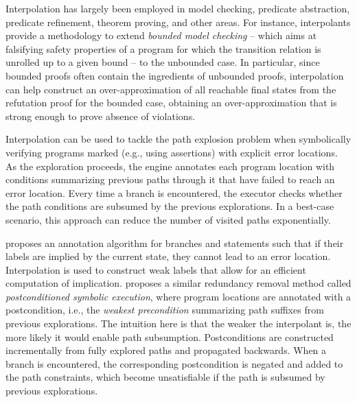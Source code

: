 Interpolation has largely been employed in model checking, predicate abstraction, predicate refinement, theorem proving, and other areas. For instance, interpolants provide a methodology to extend {\em bounded model checking} -- which aims at falsifying safety properties of a program for which the transition relation is unrolled up to a given bound -- to the unbounded case. In particular, since bounded proofs often contain the ingredients of unbounded proofs, interpolation can help construct an over-approximation of all reachable final states from the refutation proof for the bounded case, obtaining an over-approximation that is strong enough to prove absence of violations.

 Interpolation can be used to tackle the path explosion problem when symbolically verifying programs marked (e.g., using assertions) with explicit error locations. As the exploration proceeds, the engine annotates each program location with conditions summarizing previous paths through it that have failed to reach an error location. Every time a branch is encountered, the executor checks whether the path conditions are subsumed by the previous explorations. In a best-case scenario, this approach can reduce the number of visited paths exponentially. %

\cite{McMillan10} proposes an annotation algorithm for branches and statements such that if their labels are implied by the current state, they cannot lead to an error location. Interpolation is used to construct weak labels that allow for an efficient computation of implication. \cite{YYG15} proposes a similar redundancy removal method called {\em postconditioned symbolic execution}, where  program locations are annotated with a postcondition, i.e., the {\em weakest precondition} summarizing path suffixes from previous explorations. The intuition here is that the weaker the interpolant is, the more likely it would enable path subsumption. Postconditions are constructed incrementally from fully explored paths and propagated backwards. When a branch is encountered, the corresponding postcondition is negated and added to the path constraints, which become unsatisfiable if the path is subsumed by previous explorations.

